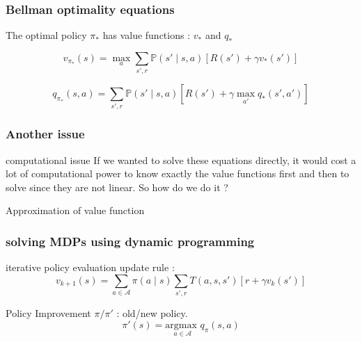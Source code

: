 \documentclass[dvipsnames,svgnames]{beamer}
\begin{document}
\begin{frame}
\frametitle{Bellman optimality equations}

The optimal policy $\pi_{*}$ has value functions : $v_*$ and $q_*$

\begin{block}{}

\begin{equation}
v_{\pi_{*}}(s)=\max_{a} \sum_{s',r}\mathbb{P}(s'\mid s,a)[R(s')+\gamma v_{*}(s')]
\label{bellman_opt_v}
\end{equation}

\begin{equation}
q_{\pi_{*}}(s,a)= \sum_{s',r}\mathbb{P}(s' \mid s,a)[R(s')+\gamma \max_{a'}q_{*}(s',a')]
\label{bellman_opt_q}
\end{equation}
\end{block}

\end{frame}

\begin{frame}
\frametitle{Another issue}
\begin{alertblock}{computational issue}
If we wanted to solve these equations directly, it would cost a lot of computational power to know exactly the value functions first and then to solve since they are not linear. So how do we do it ? 
\end{alertblock}

\pause 
\vspace{1cm}
\centering
Approximation of value function

\end{frame}

\begin{frame}
\frametitle{solving MDPs using dynamic programming}
\begin{block}{iterative policy evaluation}
update rule : 
$$ v_{k+1}(s)=\sum_{a \in \mathcal{A}}\pi(a \mid s)\sum_{s',r}T(a,s,s')\left[r+\gamma v_k(s')\right] $$
\end{block}
\pause
\begin{block}{Policy Improvement}
$\pi/\pi'$ : old/new policy.
$$\pi'(s) = \underset{a \in \mathcal{A}}{\text{argmax } } q_{\pi}(s,a) $$
\end{block}

\end{frame}
\end{document}
